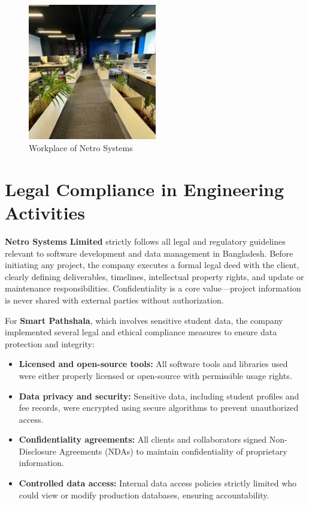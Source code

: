 \documentclass[12pt,a4paper]{report}
\newcommand{\company}[1]{\textcolor{companycolor}{\textbf{#1}}}
\newcommand{\project}[1]{\textcolor{projectcolor}{\textbf{#1}}}
\newenvironment{coloritemize}
{\begin{itemize}[label=\textcolor{primaryblue}{$\bullet$}]}
{\end{itemize}}
\begin{document}
\newpage
\begin{figure}[h!] 
\centering \includegraphics[width=0.5\textwidth]{Figures/workplace.png} \caption{Workplace of Netro Systems}
\end{figure}

\section{Legal Compliance in Engineering Activities}
\company{Netro Systems Limited} strictly follows all legal and regulatory guidelines relevant to software development and data management in Bangladesh. Before initiating any project, the company executes a formal legal deed with the client, clearly defining deliverables, timelines, intellectual property rights, and update or maintenance responsibilities. Confidentiality is a core value—project information is never shared with external parties without authorization.

For \project{Smart Pathshala}, which involves sensitive student data, the company implemented several legal and ethical compliance measures to ensure data protection and integrity:

\begin{coloritemize}
    \item \textcolor{skillcolor}{\textbf{Licensed and open-source tools:}} All software tools and libraries used were either properly licensed or open-source with permissible usage rights.
    \item \textcolor{skillcolor}{\textbf{Data privacy and security:}} Sensitive data, including student profiles and fee records, were encrypted using secure algorithms to prevent unauthorized access.
    \item \textcolor{skillcolor}{\textbf{Confidentiality agreements:}} All clients and collaborators signed Non-Disclosure Agreements (NDAs) to maintain confidentiality of proprietary information.
    \item \textcolor{skillcolor}{\textbf{Controlled data access:}} Internal data access policies strictly limited who could view or modify production databases, ensuring accountability.
\end{coloritemize}
\end{document}
